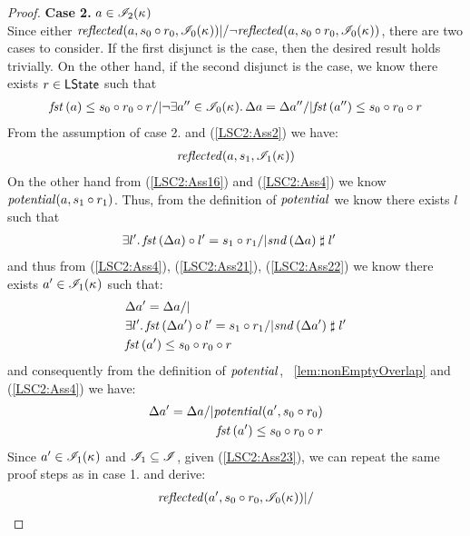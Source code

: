 \begin{lemma}
\begin{proof}
\noindent\textbf{Case 2. } $a \in \mathscr{I}_2(\kappa_{})$\\
Since either $\mathit{reflected}(a, s_0 \circ r_0, \mathscr{I}_0(\kappa_{})) |/ \neg \mathit{reflected}(a, s_0 \circ r_0, \mathscr{I}_0(\kappa_{}))$, there are two cases to consider. If the first disjunct is the case, then the desired result holds trivially. On the other hand, if the second disjunct is the case, we know there exists $r \in \textsf{LState}$ such that 
%
\begin{align}
	\mathit{fst}\left(a\right) \leq s_0 \circ r_0 \circ r /| \neg\exists a'' \in \mathscr{I}_0(\kappa_{}).\, \Delta {a} = \Delta {a''} /| \mathit{fst}\left(a''\right) \leq s_0 \circ r_0 \circ r \label{LSC2:Ass21}
\end{align}
%
From the assumption of case 2. and (\ref{LSC2:Ass2}) we have:
\begin{align}
	\mathit{reflected}(a, s_1, \mathscr{I}_1(\kappa_{})) \label{LSC2:Ass22}
\end{align}	
On the other hand from (\ref{LSC2:Ass16}) and (\ref{LSC2:Ass4}) we know $\mathit{potential}(a, s_1 \circ r_1)$. Thus, from the definition of $\mathit{potential}$ we know there exists $l$ such that 
%
\begin{align*}
	& \exists l'.\, \mathit{fst}\left(\Delta {a}\right) \circ l' = s_1 \circ r_1 /| \mathit{snd}\left(\Delta {a}\right) \mathrel{\sharp} l'
\end{align*}
%
and thus from (\ref{LSC2:Ass4}), (\ref{LSC2:Ass21}), (\ref{LSC2:Ass22}) we know there exists $a' \in \mathscr{I}_1(\kappa_{})$ such that: 
%
\begin{align*}
	& \Delta {a'} = \Delta {a} /|\\
	& \exists l'.\, \mathit{fst}\left(\Delta {a'}\right) \circ l' = s_1 \circ r_1 /| \mathit{snd}\left(\Delta {a'}\right) \mathrel{\sharp} l'\\
	& \mathit{fst}\left(a'\right) \leq s_0 \circ r_0 \circ r
\end{align*}
%
and consequently from the definition of $\mathit{potential}$, \lem~\ref{lem:nonEmptyOverlap} and (\ref{LSC2:Ass4}) we have: 
%
\begin{align}
	\Delta {a'} = \Delta {a} /| \mathit{potential}(a', s_0 \circ r_0) \label{LSC2:Ass23}\\
	\mathit{fst}\left(a'\right) \leq s_0 \circ r_0 \circ r \label{LSC2:Ass24}
\end{align}
Since $a' \in \mathscr{I}_1(\kappa_{})$ and $\mathscr{I}_1 \subseteq \mathscr{I}$, given (\ref{LSC2:Ass23}), we can repeat the same proof steps as in case 1. and derive:
%
\begin{align*}
	&\m{reflected}(a', s_0 \composeL r_0, \lmod_0(\ca{})) |/ \\

\end{align*}
\end{proof}
\end{lemma}
